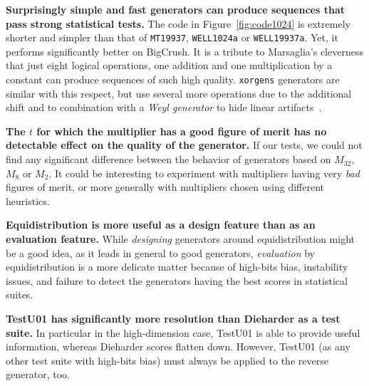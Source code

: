 \documentclass{acmsmalltr}
\newcommand{\wella}{\texttt{WELL1024a}\xspace}
\newcommand{\wellb}{\texttt{WELL19937a}\xspace}
\newcommand{\mt}[1][]{\texttt{MT19937}\xspace}
\newcommand{\xorgens}[1][]{\texttt{xorgens#1}\xspace}
\begin{document}
\smallskip\noindent\textbf{Surprisingly simple and fast generators can produce
sequences that pass strong statistical tests.} The code in
Figure~\ref{fig:code1024} is extremely shorter and simpler than that of \mt,
\wella or \wellb. Yet, it performs significantly better on BigCrush. It is a tribute
to Marsaglia's cleverness that just eight logical operations, one addition and one multiplication by a constant can 
produce sequences of such high quality. \xorgens generators are similar with this respect,
but use several more operations due to the additional shift and to combination with a \emph{Weyl generator} to 
hide linear artifacts~\cite{BreSLPRNGUSX}.

\smallskip\noindent\textbf{The $t$ for which the multiplier has a good figure of merit has no detectable
effect on the quality of the generator.} If our tests, we could not find any significant difference
between the behavior of generators based on $M_{32}$, $M_8$ or $M_2$. It could be interesting 
to experiment with multipliers having very \emph{bad} figures of merit, or more
generally with multipliers chosen using different heuristics.

\smallskip\noindent\textbf{Equidistribution is more useful as a design feature
than as an evaluation feature.} While \emph{designing} generators around
equidistribution might be a good idea, as it leads in general to good
generators, \emph{evaluation} by equidistribution is a more delicate matter
because of high-bits bias, instability issues, and failure to detect the generators having the
best scores in statistical suites.

\smallskip\noindent\textbf{TestU01 has significantly more resolution than
Dieharder as a test suite.} In particular in the high-dimension case, TestU01 is
able to provide useful information, whereas Dieharder scores flatten down.
However, TestU01 (as any other test suite with high-bits bias) must always be
applied to the reverse generator, too.



\end{document}
